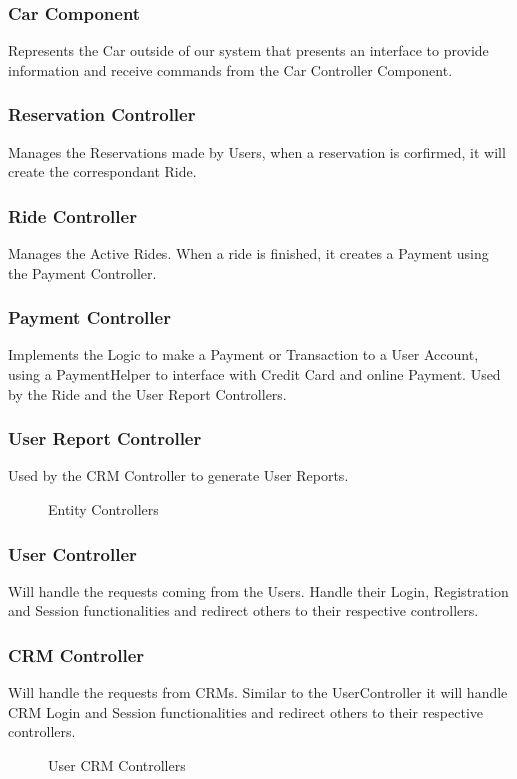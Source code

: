 \documentclass[a4paper]{article}
\begin{document}
\subsubsection{Car Component}
Represents the Car outside of our system that presents an interface to provide information and receive commands from the Car Controller Component.
\subsubsection{Reservation Controller}
Manages the Reservations made by Users, when a reservation is corfirmed, it will create the correspondant Ride.
\subsubsection{Ride Controller}
Manages the Active Rides. When a ride is finished, it creates a Payment using the Payment Controller.
\subsubsection{Payment Controller}
Implements the Logic to make a Payment or Transaction to a User Account, using a PaymentHelper to interface with Credit Card and online Payment. Used by the Ride and the User Report Controllers.
\subsubsection{User Report Controller}
Used by the CRM Controller to generate User Reports.
\begin{figure}[h]
\centering
\vspace*{\fill}
\noindent{}%
\caption {Entity Controllers}
\vspace*{0.5cm}
\end{figure}
\subsubsection{User Controller}
Will handle the requests coming from the Users. Handle their Login, Registration and Session functionalities and redirect others to their respective controllers.
\subsubsection{CRM Controller}
Will handle the requests from CRMs. Similar to the UserController it will handle CRM Login and Session functionalities and redirect others to their respective controllers.
\newpage
\begin{figure}[h]
\centering
\vspace*{\fill}
\noindent{}%
\caption {User CRM Controllers}
\vspace*{0.1cm}
\end{figure}
\end{document}
